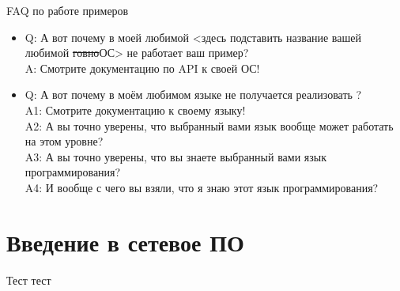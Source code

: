 \documentclass[ignorenonframetext, hyperref={pdftex, unicode}]{beamer}
\begin{document}
\begin{frame}{FAQ по работе примеров}
	\begin{itemize}
		\item Q: А вот почему в моей любимой {\footnotesize <здесь подставить название вашей любимой \sout{говно}ОС>} не работает ваш пример?\\
	A: Смотрите документацию по API к своей ОС!
		\item Q: А вот почему в моём любимом языке {\footnotesize <здесь подставить название вашего любимого языка>} не получается реализовать {\footnotesize <здесь подставить название фичи, которую не получается использовать>}?\\
	A1: Смотрите документацию к своему языку!\\
	A2: А вы точно уверены, что выбранный вами язык вообще может работать на этом уровне?\\
	A3: А вы точно уверены, что вы знаете выбранный вами язык программирования?\\
	A4: И вообще с чего вы взяли, что я знаю этот язык программирования?
	\end{itemize}
\end{frame}

\section{Введение в сетевое ПО}
\begin{frame}{Тест}
	тест
\end{frame}

\begin{frame}{}
\end{frame}

\begin{frame}{}
\end{frame}
\end{document}
